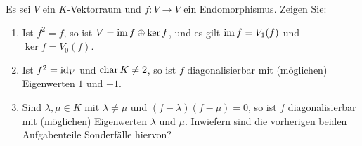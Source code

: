 \documentclass[a4paper,10pt]{scrartcl}
\begin{document}


\begin{question}
  Es sei $V$ ein $K$-Vektorraum und $f \colon V \to V$ ein Endomorphismus.
  Zeigen Sie:
  \begin{enumerate}[leftmargin=*]
    \item
      Ist $f^2 = f$, so ist $V = \operatorname{im} f \oplus \ker f$, und es gilt $\operatorname{im} f = V_1(f)$ und $\ker f = V_0(f)$.
    \item
      Ist $f^2 = \operatorname{id}_V$ und $\operatorname{char} K \neq 2$, so ist $f$ diagonalisierbar mit (möglichen) Eigenwerten $1$ und $-1$.
    \item
      Sind $\lambda, \mu \in K$ mit $\lambda \neq \mu$ und $(f-\lambda)(f-\mu) = 0$, so ist $f$ diagonalisierbar mit (möglichen) Eigenwerten $\lambda$ und $\mu$.
      Inwiefern sind die vorherigen beiden Aufgabenteile Sonderfälle hiervon?
  \end{enumerate}
\end{question}
\end{document}

